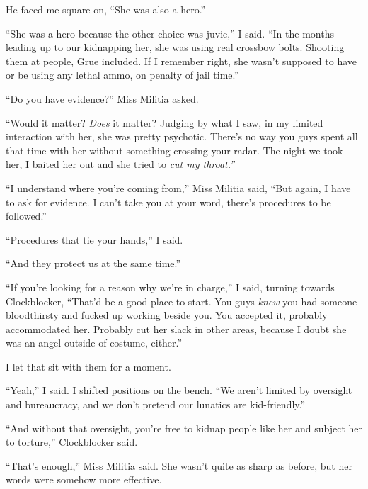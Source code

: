 He faced me square on, ``She was also a hero.''



``She was a hero because the other choice was juvie,'' I said.  ``In the months leading up to our kidnapping her, she was using real crossbow bolts.  Shooting them at people, Grue included.  If I remember right, she wasn't supposed to have or be using any lethal ammo, on penalty of jail time.''



``Do you have evidence?'' Miss Militia asked.



``Would it matter?  \emph{Does} it matter?  Judging by what I saw, in my limited interaction with her, she was pretty psychotic.  There's no way you guys spent all that time with her without something crossing your radar.  The night we took her, I baited her out and she tried to \emph{cut my throat.''}



``I understand where you're coming from,'' Miss Militia said, ``But again, I have to ask for evidence.  I can't take you at your word, there's procedures to be followed.''



``Procedures that tie your hands,'' I said.



``And they protect us at the same time.''



``If you're looking for a reason why we're in charge,'' I said, turning towards Clockblocker, ``That'd be a good place to start.  You guys \emph{knew} you had someone bloodthirsty and fucked up working beside you.  You accepted it, probably accommodated her.  Probably cut her slack in other areas, because I doubt she was an angel outside of costume, either.''



I let that sit with them for a moment.



``Yeah,'' I said.  I shifted positions on the bench.  ``We aren't limited by oversight and bureaucracy, and we don't pretend our lunatics are kid-friendly.''



``And without that oversight, you're free to kidnap people like her and subject her to torture,''  Clockblocker said.



``That's enough,'' Miss Militia said.  She wasn't quite as sharp as before, but her words were somehow more effective.



